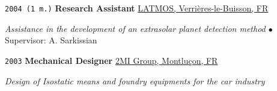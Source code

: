 \noindent \texttt{2004 (1 m.)} \tab \textbf{Research Assistant} \tab
\href{https://www3.latmos.ipsl.fr/index.php/fr/accueil-latmos}{LATMOS, Verrières-le-Buisson, FR}
\vspace{.3em}
\begin{adjustwidth}{7em}{}
\textit{Assistance in the development of an extrasolar planet detection method $\bullet$} Supervisor: A. Sarkissian
\end{adjustwidth}
\vspace{.5em}

\noindent \texttt{2003} \tab \textbf{Mechanical Designer} \tab
\href{http://www.2migroup.eu/fr/}{2MI Group, Montluçon, FR}
\vspace{.3em}
\begin{adjustwidth}{7em}{}
\textit{Design of Isostatic means and foundry equipments for the car industry}
\end{adjustwidth}